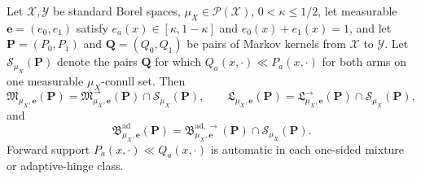 Let \(\mathcal X,\mathcal Y\) be standard Borel spaces, \(\mu_X\in\mathcal P(\mathcal X)\), \(0<\kappa\le1/2\), let measurable \(\boldsymbol e=(e_0,e_1)\) satisfy \(e_a(x)\in[\kappa,1-\kappa]\) and \(e_0(x)+e_1(x)=1\), and let \(\boldsymbol P=(P_0,P_1)\) and \(\boldsymbol Q=(Q_0,Q_1)\) be pairs of Markov kernels from \(\mathcal X\) to \(\mathcal Y\).  Let \(\mathcal S_{\mu_X}(\boldsymbol P)\) denote the pairs \(\boldsymbol Q\) for which \(Q_a(x,\cdot)\ll P_a(x,\cdot)\) for both arms on one measurable \(\mu_X\)-conull set.  Then
\[
 \mathfrak M_{\mu_X,\boldsymbol e}(\boldsymbol P)=\mathfrak M^{\to}_{\mu_X,\boldsymbol e}(\boldsymbol P)\cap\mathcal S_{\mu_X}(\boldsymbol P),\qquad
 \mathfrak L_{\mu_X,\boldsymbol e}(\boldsymbol P)=\mathfrak L^{\to}_{\mu_X,\boldsymbol e}(\boldsymbol P)\cap\mathcal S_{\mu_X}(\boldsymbol P),
\]
and
\[
 \mathfrak B^{\mathrm{ad}}_{\mu_X,\boldsymbol e}(\boldsymbol P)=\mathfrak B^{\mathrm{ad},\to}_{\mu_X,\boldsymbol e}(\boldsymbol P)\cap\mathcal S_{\mu_X}(\boldsymbol P).
\]
Forward support \(P_a(x,\cdot)\ll Q_a(x,\cdot)\) is automatic in each one-sided mixture or adaptive-hinge class.
